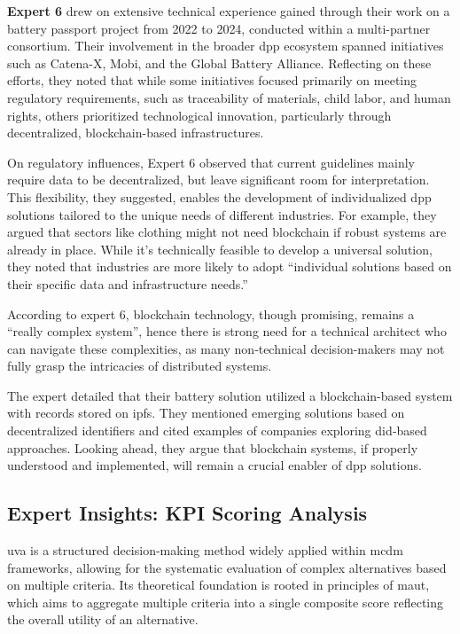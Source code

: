 \textbf{Expert 6} drew on extensive technical experience gained through their work on a battery passport project from 2022 to 2024, conducted within a multi-partner consortium. Their involvement in the broader \ac{dpp} ecosystem spanned initiatives such as Catena-X, Mobi, and the Global Battery Alliance. Reflecting on these efforts, they noted that while some initiatives focused primarily on meeting regulatory requirements, such as traceability of materials, child labor, and human rights, others prioritized technological innovation, particularly through decentralized, blockchain-based infrastructures.

On regulatory influences, Expert 6 observed that current guidelines mainly require data to be decentralized, but leave significant room for interpretation. This flexibility, they suggested, enables the development of individualized \ac{dpp} solutions tailored to the unique needs of different industries. For example, they argued that sectors like clothing might not need blockchain if robust systems are already in place. While it's technically feasible to develop a universal solution, they noted that industries are more likely to adopt ``individual solutions based on their specific data and infrastructure needs.''

According to expert 6, blockchain technology, though promising, remains a ``really complex system'', hence there is strong need for a technical architect who can navigate these complexities, as many non‐technical decision-makers may not fully grasp the intricacies of distributed systems.

The expert detailed that their battery solution utilized a blockchain-based system with records stored on \ac{ipfs}. They mentioned emerging solutions based on decentralized identifiers and cited examples of companies exploring \ac{did}‐based approaches. Looking ahead, they argue that blockchain systems, if properly understood and implemented, will remain a crucial enabler of \ac{dpp} solutions.

\subsection{Expert Insights: KPI Scoring Analysis}

\ac{uva} is a structured decision-making method widely applied within \ac{mcdm} frameworks, allowing for the systematic evaluation of complex alternatives based on multiple criteria. Its theoretical foundation is rooted in principles of \ac{maut}, which aims to aggregate multiple criteria into a single composite score reflecting the overall utility of an alternative. \autocite{Keeney.1979, Belton.2002}

